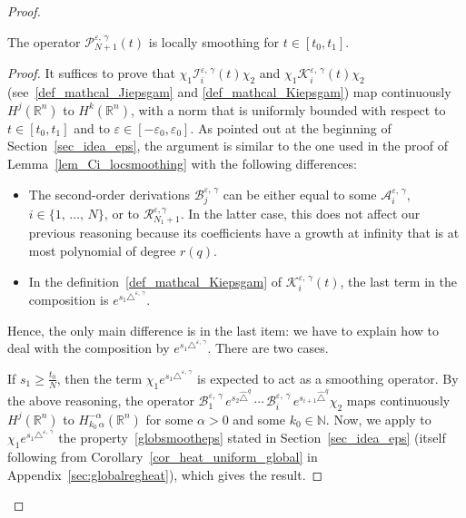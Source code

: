 \documentclass[AHL,Unicode,published]{cedram}
\newcommand*\R{\mathbb{R}}
\newcommand*\N{\mathbb{N}}
\newcommand{\calK}{\mathcal{K}}
\newcommand{\calA}{\mathcal{A}}
\newcommand{\calR}{\mathcal{R}}
\newcommand{\calI}{\mathcal{I}}
\newcommand{\calP}{\mathcal{P}}
\newcommand{\calB}{\mathcal{B}}
\renewcommand{\geq}{\geqslant}
\begin{document}
\begin{proof}
\begin{lemm}
The operator $\calP_{N+1}^{\varepsilon,\,\gamma}(t)$ is locally smoothing for $t\in[t_0,t_1]$.
\end{lemm}

\begin{proof}
It suffices to prove that $\chi_1\calI_i^{\varepsilon,\,\gamma}(t)\chi_2$ and $\chi_1\calK_i^{\varepsilon,\,\gamma}(t)\chi_2$ (see~\eqref{def_mathcal_Jiepsgam} and \eqref{def_mathcal_Kiepsgam}) map continuously $H^j(\R^n)$ to $H^k(\R^n)$, with a norm that is uniformly bounded with respect to $t\in[t_0,t_1]$ and to $\varepsilon\in[-\varepsilon_0,\varepsilon_0]$. As pointed out at the beginning of Section~\ref{sec_idea_eps}, the argument is similar to the one used in the proof of Lemma~\ref{lem_Ci_locsmoothing} with the following differences:
\begin{itemize}
\item The second-order derivations $\calB_{j}^{\varepsilon,\,\gamma}$ can be either equal to some $\calA_i^{\varepsilon,\,\gamma}$, $i\in\{1,\,\ldots,\,N\}$, or to $\calR_{N_1+1}^{\varepsilon,\gamma}$. In the latter case, this does not affect our previous reasoning because its coefficients have a growth at infinity that is at most polynomial of degree $r(q)$.
\item In the definition~\eqref{def_mathcal_Kiepsgam} of $\calK_i^{\varepsilon,\,\gamma}(t)$, the last term in the composition is $e^{s_1 \triangle^{\varepsilon,\,\gamma}}$.
\end{itemize}
Hence, the only main difference is in the last item: we have to explain how to deal with the composition by $e^{s_1 \triangle^{\varepsilon,\,\gamma}}$. There are two cases.

If $s_1\geq \frac{t_0}{N}$, then the term $\chi_1 e^{s_1 \triangle^{\varepsilon,\,\gamma}}$ is expected to act as a smoothing operator. By the above reasoning, the operator $\calB_{1}^{\varepsilon,\,\gamma} \, e^{s_2 \widehat{\triangle}^{q}}\,\cdots\,\calB_i^{\varepsilon,\,\gamma} \, e^{s_{i+1} \widehat{\triangle}^{q}} \chi_2$ maps continuously $H^j(\R^n)$ to $H^{-\alpha}_{k_0\,\alpha}(\R^n)$ for some $\alpha>0$ and some $k_0\in\N$. Now, we apply to $\chi_1 e^{s_1 \triangle^{\varepsilon,\,\gamma}}$ the property~\eqref{globsmootheps} stated in Section~\ref{sec_idea_eps} (itself following from Corollary~\ref{cor_heat_uniform_global} in Appendix~\ref{sec:globalregheat}), which gives the result.


\end{proof}
\end{proof}
\end{document}
